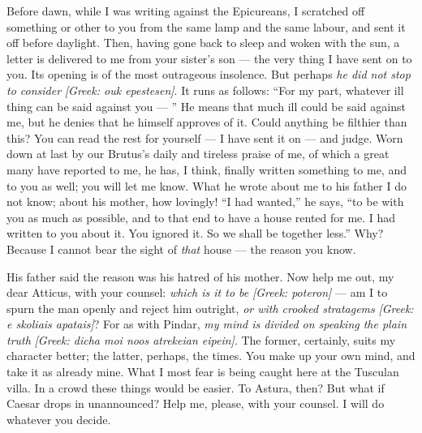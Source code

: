 

 Before dawn, while I was writing against the Epicureans, I scratched off something or other to you from the same lamp and the same labour, and sent it off before daylight. Then, having gone back to sleep and woken with the sun, a letter is delivered to me from your sister's son --- the very thing I have sent on to you. Its opening is of the most outrageous insolence. But perhaps \textit{he did not stop to consider} \textit{[Greek: ouk epestesen]}. It runs as follows: ``For my part, whatever ill thing can be said against you --- '' He means that much ill could be said against me, but he denies that he himself approves of it. Could anything be filthier than this? You can read the rest for yourself --- I have sent it on --- and judge. Worn down at last by our Brutus's daily and tireless praise of me, of which a great many have reported to me, he has, I think, finally written something to me, and to you as well; you will let me know. What he wrote about me to his father I do not know; about his mother, how lovingly! ``I had wanted,'' he says, ``to be with you as much as possible, and to that end to have a house rented for me. I had written to you about it. You ignored it. So we shall be together less.'' Why? Because I cannot bear the sight of \textit{that} house --- the reason you know.

 His father said the reason was his hatred of his mother. Now help me out, my dear Atticus, with your counsel: \textit{which is it to be} \textit{[Greek: poteron]} --- am I to spurn the man openly and reject him outright, \textit{or with crooked stratagems} \textit{[Greek: e skoliais apatais]}? For as with Pindar, \textit{my mind is divided on speaking the plain truth} \textit{[Greek: dicha moi noos atrekeian eipein]}. The former, certainly, suits my character better; the latter, perhaps, the times. You make up your own mind, and take it as already mine. What I most fear is being caught here at the Tusculan villa. In a crowd these things would be easier. To Astura, then? But what if Caesar drops in unannounced? Help me, please, with your counsel. I will do whatever you decide.
